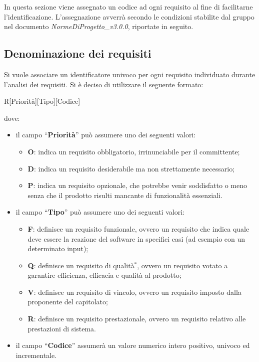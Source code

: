 In questa sezione viene assegnato un codice ad ogni requisito al fine di facilitarne l'identificazione. L'assegnazione avverrà secondo le condizioni stabilite dal gruppo nel documento \textit{NormeDiProgetto\_v3.0.0}, riportate in seguito. 
\subsection{Denominazione dei requisiti}
Si vuole associare un identificatore univoco per ogni requisito individuato durante l'analisi dei requisiti. Si \`e deciso di utilizzare il seguente formato:
  \begin{center}
    R[Priorità][Tipo][Codice]
	\end{center}
dove:
	\begin{itemize}
	\item il campo “\textbf{Priorità}” può assumere uno dei seguenti 	valori:
		\begin{itemize}
  		\item \textbf{O}: indica un requisito obbligatorio, irrinunciabile per il committente;
		\item \textbf{D}: indica un requisito desiderabile ma non strettamente necessario;
		\item \textbf{P}: indica un requisito opzionale, che potrebbe venir soddisfatto o meno senza che il prodotto risulti mancante di funzionalità essenziali.
		\end{itemize}
	\item il campo “\textbf{Tipo}” può assumere uno dei seguenti valori:
		\begin{itemize}
  		\item \textbf{F}: definisce un requisito funzionale, ovvero un requisito che indica quale deve essere la reazione del software in specifici casi (ad esempio con  un determinato input);
		\item \textbf{Q}: definisce un requisito di qualità$^*$, ovvero un requisito votato a garantire efficienza, efficacia e qualità al prodotto;
		\item \textbf{V}: definisce un requisito di vincolo, ovvero un requisito imposto dalla proponente del capitolato;
		\item \textbf{R}: definisce un requisito prestazionale, ovvero un requisito relativo alle prestazioni di sistema.
		\end{itemize}
	\item il campo “\textbf{Codice}” assumerà un valore numerico intero positivo, univoco ed incrementale.
	\end{itemize}
\newpage
